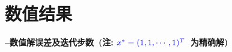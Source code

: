 \documentclass[UTF8]{ctexart}
\begin{document}
\section{数值结果}

{\bf --数值解误差及迭代步数~(注: $\color{blue}x^{*}=(1,1,\cdots,1)^T$~为精确解)}

\end{document}
